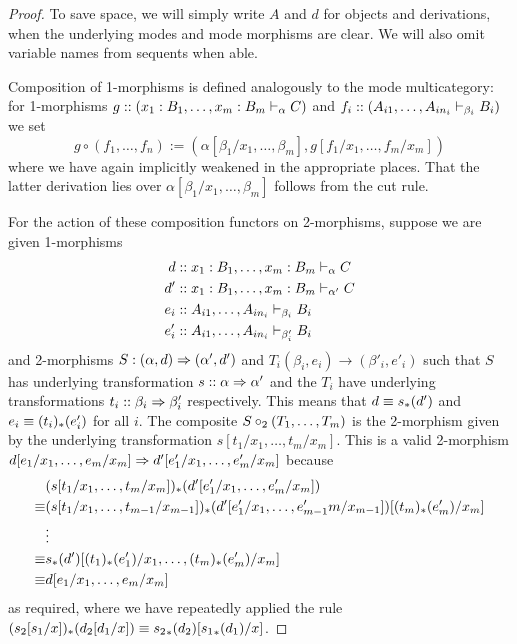 \begin{proof}
To save space, we will simply write $A$ and $d$ for objects and derivations, when the underlying modes and mode morphisms are clear. We will also omit variable names from sequents when able.

Composition of 1-morphisms is defined analogously to the mode multicategory: for 1-morphisms $g :: (x_1 : B_1, \dots, x_m : B_m \vdash_{\alpha} C)$ and $f_i :: (A_{i1}, \dots, A_{in_i} \vdash_{\beta_i} B_i)$ we set \[g \circ (f_1, \dots, f_n) := (\alpha[\beta_1/x_1, \dots, \beta_m], g[f_1/x_1, \dots, f_m/x_m])\] where we have again implicitly weakened in the appropriate places. That the latter derivation lies over $\alpha[\beta_1/x_1, \dots, \beta_m]$ follows from the cut rule. 

For the action of these composition functors on 2-morphisms, suppose we are given 1-morphisms 
\begin{align*}
d &:: x_1 : B_1, \dots, x_m : B_m \vdash_{\alpha} C \\
d' &:: x_1 : B_1, \dots, x_m : B_m \vdash_{\alpha'} C \\
e_i &:: A_{i1}, \dots, A_{in_i} \vdash_{\beta_i} B_i \\
e'_i &:: A_{i1}, \dots, A_{in_i} \vdash_{\beta'_i} B_i 
\end{align*}
and 2-morphisms $S : (\alpha, d) \Rightarrow (\alpha', d')$ and $T_i (\beta_i, e_i) \to (\beta'_i, e'_i)$ such that $S$ has underlying transformation $s :: \alpha \Rightarrow \alpha'$ and the $T_i$ have underlying transformations $t_i :: \beta_i \Rightarrow \beta'_i$ respectively. This means that $d \equiv s_*(d')$ and $e_i \equiv (t_i)_*(e'_i)$ for all $i$. The composite $S \mathbin{\circ_2} (T_1, \dots, T_m)$ is the 2-morphism given by the underlying transformation $s[t_1/x_1, \dots, t_m/x_m]$. This is a valid 2-morphism $d[e_1/x_1, \dots, e_m/x_m] \Rightarrow d'[e'_1/x_1, \dots, e'_m/x_m]$ because
\begin{align*}
&(s[t_1/x_1, \dots, t_m/x_m])_*(d'[e'_1/x_1, \dots, e'_m/x_m]) \\
\equiv &(s[t_1/x_1, \dots, t_{m-1}/x_{m-1}])_*(d'[e'_1/x_1, \dots, e'_{m-1}m/x_{m-1}])[(t_m)_*(e'_m)/x_m] \\
&\vdots \\
\equiv &s_*(d')[(t_1)_*(e'_1)/x_1, \dots, (t_m)_*(e'_m)/x_m] \\
\equiv &d[e_1/x_1, \dots, e_m/x_m]
\end{align*}
as required, where we have repeatedly applied the rule $(s_2[s_1/x])_*(d_2[d_1/x]) \equiv {s_2}_*(d_2)[{s_1}_*(d_1)/x]$.


\end{proof}
